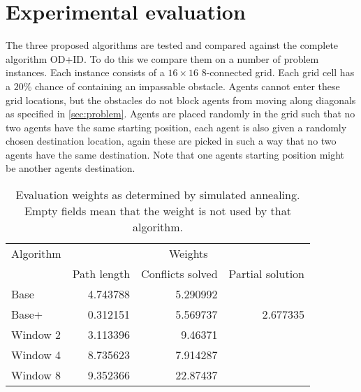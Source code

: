 \section{Experimental evaluation}\label{sec:results}

The three proposed algorithms are tested and compared against the complete
algorithm OD+ID. To do this we compare them on a number of problem instances.
Each instance consists of a $16 \times 16$ 8-connected grid. Each grid cell has
a $20\%$ chance of containing an impassable obstacle. Agents cannot enter these
grid locations, but the obstacles do not block agents from moving along
diagonals as specified in \autoref{sec:problem}. Agents are placed randomly in
the grid such that no two agents have the same starting position, each agent is
also given a randomly chosen destination location, again these are picked in
such a way that no two agents have the same destination. Note that one agents
starting position might be another agents destination.

\begin{table}[b]
	\centering
	\caption{Evaluation weights as determined by simulated annealing. Empty
	fields mean that the weight is not used by that algorithm.}
	\label{tbl:annealing}
	\begin{tabular}{l|r|r|r}
		Algorithm & \multicolumn{3}{c}{Weights} \\ \cline{2-4}
		& Path length & Conflicts solved & Partial solution \\ \hline
		Base     & 4.743788 & 5.290992 &  \\
		Base+    & 0.312151 & 5.569737 & 2.677335 \\
		Window 2 & 3.113396 & 9.46371 &  \\
		Window 4 & 8.735623 & 7.914287 &  \\
		Window 8 & 9.352366 & 22.87437 &
	\end{tabular}
\end{table}

